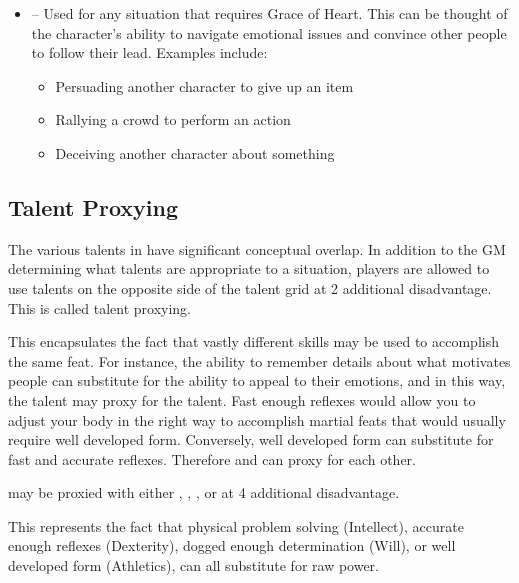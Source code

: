 \begin{GRPquicknotewide}
\begin{itemize}
\begin{itemize}
			\item A character is trying to power through pain to maintain focus on a task
			\item A character is trying to resist the effects of a sedative
		\end{itemize}
	\item {}-- Used for any situation that requires Grace of Heart. This can be thought of the character's ability to navigate emotional issues and convince other people to follow their lead. Examples include:
		\begin{itemize}
			\item Persuading another character to give up an item
			\item Rallying a crowd to perform an action
			\item Deceiving another character about something
		\end{itemize}
\end{itemize}
\end{GRPquicknotewide}

\subsection{Talent Proxying}

The various talents in \GammaRP{} have significant conceptual overlap. In addition to the GM determining what talents are appropriate to a situation, players are allowed to use talents on the opposite side of the talent grid at 2 additional disadvantage. This is called talent proxying.

This encapsulates the fact that vastly different skills may be used to accomplish the same feat. For instance, the ability to remember details about what motivates people can substitute for the ability to appeal to their emotions, and in this way, the  talent may proxy for the  talent. Fast enough reflexes would allow you to adjust your body in the right way to accomplish martial feats that would usually require well developed form. Conversely, well developed form can substitute for fast and accurate reflexes. Therefore  and  can proxy for each other.

 may be proxied with either , , , or  at 4 additional disadvantage.

This represents the fact that physical problem solving (Intellect), accurate enough reflexes (Dexterity), dogged enough determination (Will), or well developed form (Athletics), can all substitute for raw power.

